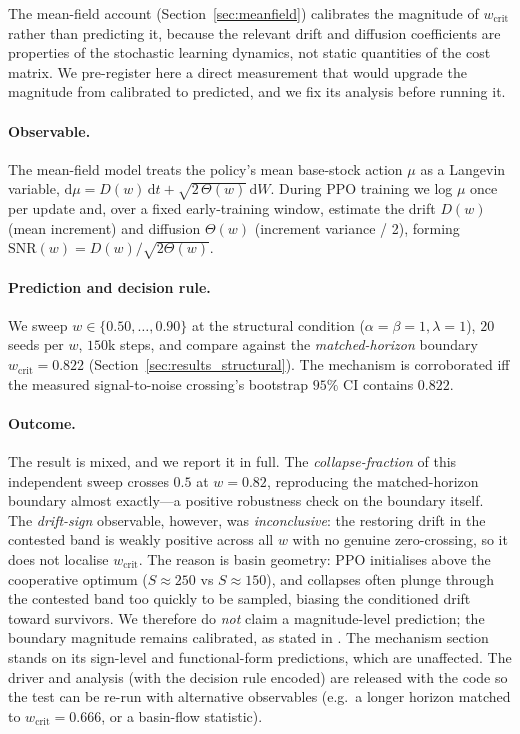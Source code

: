 \documentclass[letterpaper]{article}
\theoremstyle{plain}
\newcommand{\wcrit}{w_{\mathrm{crit}}}
\begin{document}
The mean-field account (Section~\ref{sec:meanfield}) calibrates the magnitude of
$\wcrit$ rather than predicting it, because the relevant drift and diffusion
coefficients are properties of the stochastic learning dynamics, not static
quantities of the cost matrix. We pre-register here a direct measurement that
would upgrade the magnitude from calibrated to predicted, and we fix its
analysis before running it.

\paragraph{Observable.} The mean-field model treats the policy's mean
base-stock action $\mu$ as a Langevin variable,
$\mathrm{d}\mu = D(w)\,\mathrm{d}t + \sqrt{2\,\Theta(w)}\,\mathrm{d}W$. During
PPO training we log $\mu$ once per update and, over a fixed early-training
window, estimate the drift $D(w)$ (mean increment) and diffusion $\Theta(w)$
(increment variance / 2), forming $\mathrm{SNR}(w)=D(w)/\sqrt{2\Theta(w)}$.

\paragraph{Prediction and decision rule.} We sweep
$w\in\{0.50,\dots,0.90\}$ at the structural condition
($\alpha{=}\beta{=}1,\lambda{=}1$), $20$ seeds per $w$, $150$k steps, and
compare against the \emph{matched-horizon} boundary $\wcrit=0.822$
(Section~\ref{sec:results_structural}). The mechanism is corroborated iff the
measured signal-to-noise crossing's bootstrap $95\%$ CI contains $0.822$.

\paragraph{Outcome.} The result is mixed, and we report it in full. The
\emph{collapse-fraction} of this independent sweep crosses $0.5$ at
$w=0.82$, reproducing the matched-horizon boundary almost exactly---a
positive robustness check on the boundary itself. The \emph{drift-sign}
observable, however, was \emph{inconclusive}: the restoring drift in the
contested band is weakly positive across all $w$ with no genuine
zero-crossing, so it does not localise $\wcrit$. The reason is basin
geometry: PPO initialises above the cooperative optimum ($S{\approx}250$ vs
$S{\approx}150$), and collapses often plunge through the contested band too
quickly to be sampled, biasing the conditioned drift toward survivors. We
therefore do \emph{not} claim a magnitude-level prediction; the boundary
magnitude remains calibrated, as stated in . The mechanism
section stands on its sign-level and functional-form predictions, which are
unaffected. The driver and analysis (with the decision rule encoded) are
released with the code so the test can be re-run with alternative
observables (e.g.\ a longer horizon matched to $\wcrit=0.666$, or a
basin-flow statistic).
\end{document}
